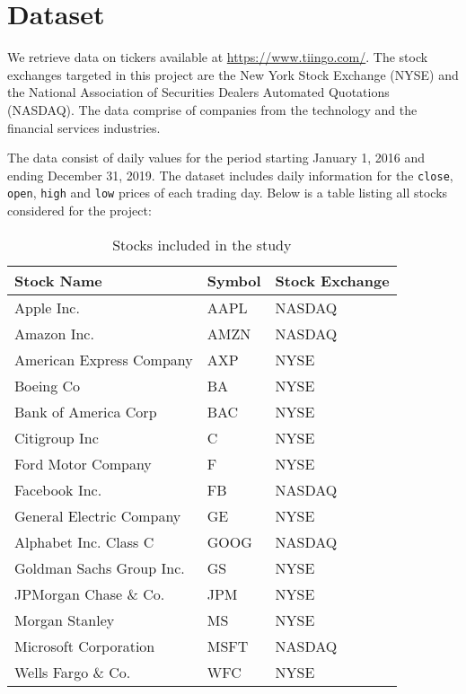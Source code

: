 \section{Dataset}
We retrieve data on tickers available at \url{https://www.tiingo.com/}. The stock exchanges targeted in this project are the New York Stock Exchange (NYSE) and the National Association of Securities Dealers Automated Quotations (NASDAQ). The data comprise of companies from the technology and the financial services industries.

The data consist of daily values for the period starting January 1, 2016 and ending December 31, 2019. The dataset includes daily information for the \texttt{close}, \texttt{open}, \texttt{high} and \texttt{low} prices of each trading day. Below is a table listing all stocks considered for the project:

\begin{table}[h]
    \centering
    \begin{tabular}{|l|l|l|}
        \hline
        \textbf{Stock Name}      & \textbf{Symbol} & \textbf{Stock Exchange} \\ \hline
        Apple Inc.               & AAPL            & NASDAQ                  \\ \hline
        Amazon Inc.              & AMZN            & NASDAQ                  \\ \hline
        American Express Company & AXP             & NYSE                    \\ \hline
        Boeing Co                & BA              & NYSE                    \\ \hline
        Bank of America Corp     & BAC             & NYSE                    \\ \hline
        Citigroup Inc            & C               & NYSE                    \\ \hline
        Ford Motor Company       & F               & NYSE                    \\ \hline
        Facebook Inc.            & FB              & NASDAQ                  \\ \hline
        General Electric Company & GE              & NYSE                    \\ \hline
        Alphabet Inc. Class C    & GOOG            & NASDAQ                  \\ \hline
        Goldman Sachs Group Inc. & GS              & NYSE                    \\ \hline
        JPMorgan Chase \& Co.    & JPM             & NYSE                    \\ \hline
        Morgan Stanley           & MS              & NYSE                    \\ \hline
        Microsoft Corporation    & MSFT            & NASDAQ                  \\ \hline
        Wells Fargo \& Co.       & WFC             & NYSE                    \\ \hline
    \end{tabular}
    \caption{Stocks included in the study}
    \label{tab:stocks_included}
\end{table}

